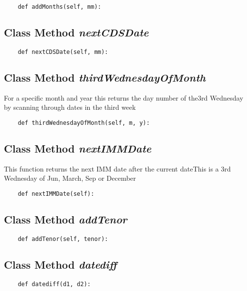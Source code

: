 \documentclass[twoside,11pt]{book}
\begin{document}
\begin{lstlisting}
    def addMonths(self, mm):
\end{lstlisting}

\subsection{Class Method {\it nextCDSDate}}


\begin{lstlisting}
    def nextCDSDate(self, mm):
\end{lstlisting}

\subsection{Class Method {\it thirdWednesdayOfMonth}}
For a specific month and year this returns the day number of the3rd Wednesday by scanning through dates in the third week 

\begin{lstlisting}
    def thirdWednesdayOfMonth(self, m, y):
\end{lstlisting}

\subsection{Class Method {\it nextIMMDate}}
This function returns the next IMM date after the current dateThis is a 3rd Wednesday of Jun, March, Sep or December 

\begin{lstlisting}
    def nextIMMDate(self):
\end{lstlisting}

\subsection{Class Method {\it addTenor}}


\begin{lstlisting}
    def addTenor(self, tenor):
\end{lstlisting}

\subsection{Class Method {\it datediff}}


\begin{lstlisting}
    def datediff(d1, d2):
\end{lstlisting}
\end{document}
